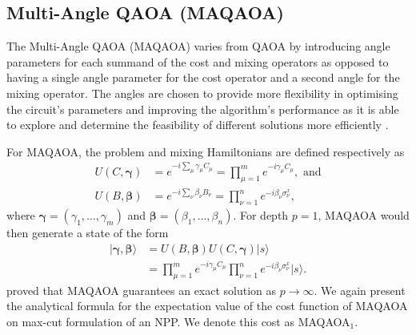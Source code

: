 \subsection{Multi-Angle QAOA (MAQAOA)}
    
    The Multi-Angle QAOA (MAQAOA) varies from QAOA by introducing angle parameters for each summand of the cost and mixing operators as opposed to having a single angle parameter for the cost operator and a second angle for the mixing operator. The angles are chosen to provide more flexibility in optimising the circuit's parameters and improving the algorithm's performance as it is able to explore and determine the feasibility of different solutions more efficiently \cite{herrman2022multi}. 

    For MAQAOA, the problem and mixing Hamiltonians are defined respectively as 
    \begin{align}
        U(C,\pmb{\gamma}) &= e^{-i\sum_\mu\gamma_\mu C_\mu}= \prod^m_{\mu=1}e^{-i\gamma_\mu C_\mu}, \text{ and} \\
        U(B,\pmb{\beta}) &= e^{-i\sum_\nu\beta_\nu B_\nu} = \prod^n_{\nu=1}e^{-i\beta_\nu \sigma^x_\nu},
    \end{align}
    where $\pmb{\gamma} = (\gamma_1,\dots,\gamma_m)$ and $\pmb{\beta} = (\beta_1,\dots,\beta_n)$. For depth $p=1$, MAQAOA would then generate a state of the form 
    \begin{align}
        |\pmb{\gamma},\pmb{\beta}\rangle &= U(B,\pmb{\beta})U(C,\pmb{\gamma})|s\rangle \nonumber \\
        &= \prod^m_{\mu=1}e^{-i\gamma_\mu C_\mu}\prod^n_{\nu=1}e^{-i\beta_\nu \sigma^x_\nu}|s\rangle.
    \end{align}
    \citet{herrman2022multi} proved that MAQAOA guarantees an exact solution as $p\to \infty$. We again present the analytical formula for the expectation value of the cost function of MAQAOA on max-cut formulation of an NPP. We denote this cost as MAQAOA$_1$.   

